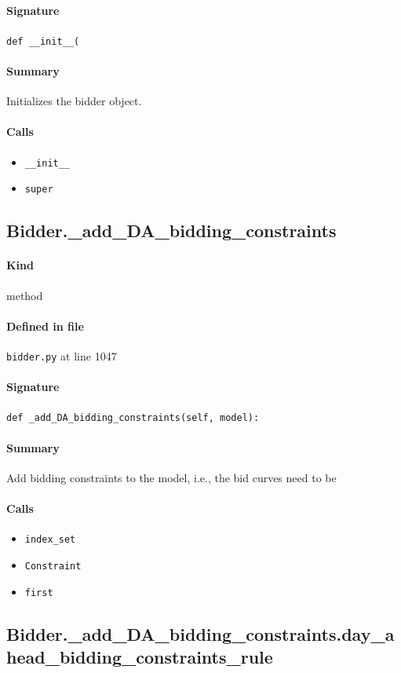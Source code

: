 \documentclass[11pt]{report}
\begin{document}
\paragraph{Signature} \texttt{def \_\_init\_\_(}
\paragraph{Summary} Initializes the bidder object.
\paragraph{Calls}
\begin{itemize}[leftmargin=*]
  \item \texttt{\_\_init\_\_}
  \item \texttt{super}
\end{itemize}
\subsection{Bidder.\_add\_DA\_bidding\_constraints}
\label{def:bidder.py:Bidder._add_DA_bidding_constraints:L1047}
\paragraph{Kind} method
\paragraph{Defined in file} \texttt{bidder.py} at line 1047
\paragraph{Signature} \texttt{def \_add\_DA\_bidding\_constraints(self, model):}
\paragraph{Summary} Add bidding constraints to the model, i.e., the bid curves need to be
\paragraph{Calls}
\begin{itemize}[leftmargin=*]
  \item \texttt{index\_set}
  \item \texttt{Constraint}
  \item \texttt{first}
\end{itemize}
\subsection{Bidder.\_add\_DA\_bidding\_constraints.day\_ahead\_bidding\_constraints\_rule}
\label{def:bidder.py:Bidder._add_DA_bidding_constraints.day_ahead_bidding_constraints_rule:L1059}
\end{document}
